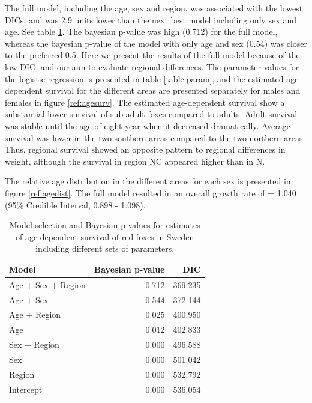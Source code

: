 \documentclass[PCJ,Unicode,screen]{cedram}
\begin{document}
The full model, including the age, sex and region, was associated with the lowest DICs, and was 2.9 units lower than the next best model including only sex and age. See table \ref{table:DICBP}. The bayesian p-value was high (0.712) for the full model, whereas the bayesian p-value of the model with only age and sex (0.54) was closer to the preferred 0.5. Here we present the results of the full model because of the low DIC, and our aim to evaluate regional differences. The parameter values for the logistic regression is presented in table \ref{table:param}, and the estimated age dependent survival for the different areas are presented separately for males and females in figure \ref{ref:agesurv}. The estimated age-dependent survival show a substantial lower survival of sub-adult foxes compared to adults. Adult survival was stable until the age of eight year when it decreased dramatically. Average survival was lower in the two southern areas compared to the two northern areas. Thus, regional survival showed an opposite pattern to regional differences in weight, although the survival in region NC appeared higher than in N. 

The relative age distribution in the different areas for each sex is presented in figure \ref{ref:agedist}. The full model resulted in an overall growth rate of \lambda = 1.040 (95\% Credible Interval, 0.898 - 1.098).


\begin{table}[!htbp]
\centering
\captionsetup{font=scriptsize}
\caption{Model selection and Bayesian p-values for estimates of age-dependent survival of red foxes in Sweden including different sets of parameters.}
\label{table:DICBP}
\scriptsize
\begin{tabular}{lrr}
\toprule
Model &  Bayesian p-value & DIC \\
\midrule
Age + Sex + Region & 0.712 & 369.235 \\
Age + Sex        & 0.544 & 372.144 \\
Age + Region       & 0.025 & 400.950 \\
Age              & 0.012 & 402.833 \\
Sex + Region       & 0.000 & 496.588 \\
Sex              & 0.000 & 501.042 \\
Region             & 0.000 & 532.792 \\
Intercept        & 0.000 & 536.054 \\
\bottomrule
\end{tabular}
\end{table}
\end{document}

